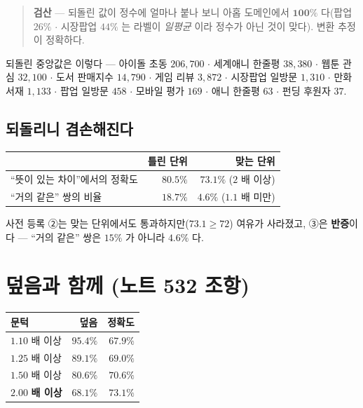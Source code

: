 \documentclass[11pt]{article}
\begin{document}
\begin{quote}
\textbf{검산} --- 되돌린 값이 정수에 얼마나 붙나 보니 아홉 도메인에서
$\mathbf{100\%}$ 다(팝업 $26\%$ $\cdot$ 시장팝업 $44\%$ 는 라벨이 \emph{일평균}
이라 정수가 아닌 것이 맞다). 변환 추정이 정확하다.
\end{quote}

되돌린 중앙값은 이렇다 --- 아이돌 초동 $206{,}700$ $\cdot$ 세계애니 한줄평
$38{,}380$ $\cdot$ 웹툰 관심 $32{,}100$ $\cdot$ 도서 판매지수 $14{,}790$
$\cdot$ 게임 리뷰 $3{,}872$ $\cdot$ 시장팝업 일방문 $1{,}310$ $\cdot$ 만화
서재 $1{,}133$ $\cdot$ 팝업 일방문 $458$ $\cdot$ 모바일 평가 $169$ $\cdot$
애니 한줄평 $63$ $\cdot$ 펀딩 후원자 $37$.

\subsection*{되돌리니 겸손해진다}

\begin{center}
\begin{tabular}{lrr}
\hline
 & 틀린 단위 & \textbf{맞는 단위} \\
\hline
``뜻이 있는 차이''에서의 정확도 & $80.5\%$ & $\mathbf{73.1\%}$ ($2$ 배 이상) \\
``거의 같은'' 쌍의 비율 & $18.7\%$ & $\mathbf{4.6\%}$ ($1.1$ 배 미만) \\
\hline
\end{tabular}
\end{center}

사전 등록 ②는 맞는 단위에서도 통과하지만($73.1 \ge 72$) 여유가 사라졌고,
③은 \textbf{반증}이다 --- ``거의 같은'' 쌍은 $15\%$ 가 아니라 $4.6\%$ 다.

\section{덮음과 함께 (노트 532 조항)}

\begin{center}
\begin{tabular}{lrr}
\hline
문턱 & 덮음 & 정확도 \\
\hline
$1.10$ 배 이상 & $95.4\%$ & $67.9\%$ \\
$1.25$ 배 이상 & $89.1\%$ & $69.0\%$ \\
$1.50$ 배 이상 & $80.6\%$ & $70.6\%$ \\
$\mathbf{2.00}$ \textbf{배 이상} & $\mathbf{68.1\%}$ & $\mathbf{73.1\%}$ \\
\hline
\end{tabular}
\end{center}
\end{document}
